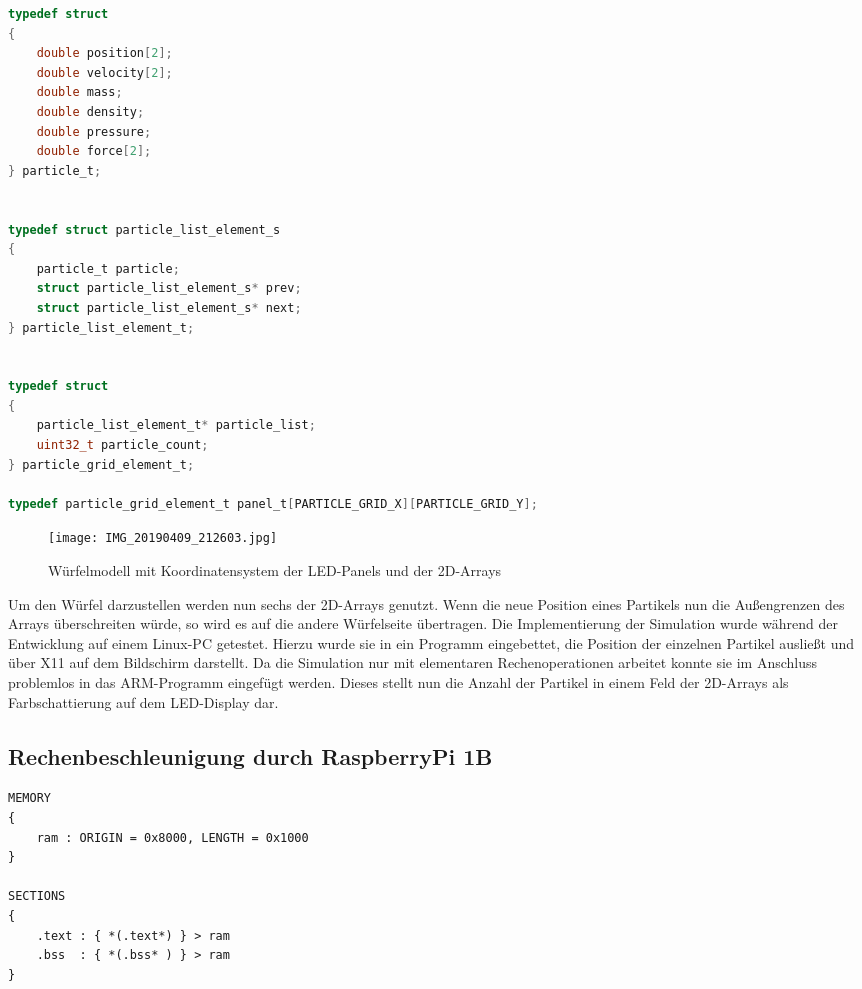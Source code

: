 \begin{lstlisting}[language={c}, caption={Datenstrukturen der SPH}, label={code.sph.structs}]
typedef struct
{
	double position[2];
	double velocity[2];
	double mass;
	double density;
	double pressure;
	double force[2];
} particle_t;


typedef struct particle_list_element_s
{
	particle_t particle;
	struct particle_list_element_s* prev;
	struct particle_list_element_s* next;
} particle_list_element_t;


typedef struct
{
	particle_list_element_t* particle_list;
	uint32_t particle_count;
} particle_grid_element_t;

typedef particle_grid_element_t panel_t[PARTICLE_GRID_X][PARTICLE_GRID_Y];
\end{lstlisting}

\begin{wrapfigure}{r}{0.5\textwidth}
	\centering
	\texttt{[image: IMG\_20190409\_212603.jpg]}
	\caption{Würfelmodell mit Koordinatensystem der LED-Panels und der 2D-Arrays}
	\label{fig:sph:cube_model}
\end{wrapfigure}

Um den Würfel darzustellen werden nun sechs der 2D-Arrays genutzt. Wenn die neue Position eines Partikels nun die Außengrenzen des Arrays überschreiten würde, so wird es auf die andere Würfelseite übertragen. Die Implementierung der Simulation wurde während der Entwicklung auf einem Linux-PC getestet. Hierzu wurde sie in ein Programm eingebettet, die Position der einzelnen Partikel ausließt und über X11 auf dem Bildschirm darstellt. Da die Simulation nur mit elementaren Rechenoperationen arbeitet konnte sie im Anschluss problemlos in das ARM-Programm eingefügt werden. Dieses stellt nun die Anzahl der Partikel in einem Feld der 2D-Arrays als Farbschattierung auf dem LED-Display dar.

\subsection{Rechenbeschleunigung durch RaspberryPi 1B}
\label{chap:impl:sph:rp}
\FloatBarrier

\begin{lstlisting}[caption={Memorymap des Raspberry Pi 1B}, label={code.sph.rp.memmap}]
MEMORY
{
	ram : ORIGIN = 0x8000, LENGTH = 0x1000
}

SECTIONS
{
	.text : { *(.text*) } > ram
	.bss  : { *(.bss* ) } > ram
}
\end{lstlisting}


